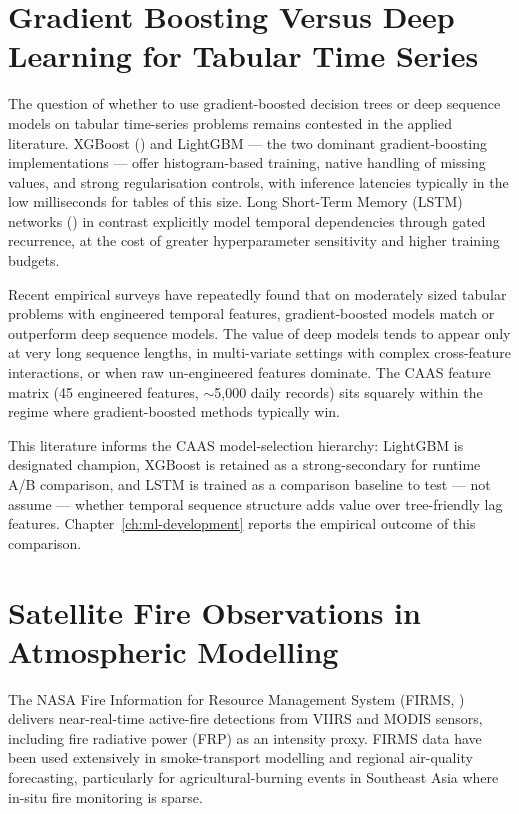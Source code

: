 \section{Gradient Boosting Versus Deep Learning for Tabular Time Series}

The question of whether to use gradient-boosted decision trees or deep
sequence models on tabular time-series problems remains contested in the
applied literature. XGBoost (\cite{xgboost}) and LightGBM --- the two
dominant gradient-boosting implementations --- offer histogram-based
training, native handling of missing values, and strong regularisation
controls, with inference latencies typically in the low milliseconds for
tables of this size. Long Short-Term Memory (LSTM) networks
(\cite{lstm}) in contrast explicitly model temporal dependencies through
gated recurrence, at the cost of greater hyperparameter sensitivity and
higher training budgets.

Recent empirical surveys have repeatedly found that on moderately sized
tabular problems with engineered temporal features, gradient-boosted models
match or outperform deep sequence models. The value of deep models tends to
appear only at very long sequence lengths, in multi-variate settings with
complex cross-feature interactions, or when raw un-engineered features
dominate. The CAAS feature matrix (45 engineered features, $\sim$5,000 daily
records) sits squarely within the regime where gradient-boosted methods
typically win.

This literature informs the CAAS model-selection hierarchy: LightGBM is
designated champion, XGBoost is retained as a strong-secondary for runtime
A/B comparison, and LSTM is trained as a comparison baseline to test --- not
assume --- whether temporal sequence structure adds value over
tree-friendly lag features. Chapter~\ref{ch:ml-development} reports the
empirical outcome of this comparison.

\section{Satellite Fire Observations in Atmospheric Modelling}

The NASA Fire Information for Resource Management System (FIRMS,
\cite{firms}) delivers near-real-time active-fire detections from VIIRS and
MODIS sensors, including fire radiative power (FRP) as an intensity proxy.
FIRMS data have been used extensively in smoke-transport modelling and
regional air-quality forecasting, particularly for agricultural-burning
events in Southeast Asia where in-situ fire monitoring is sparse.

